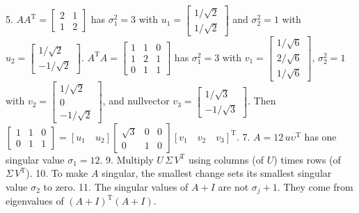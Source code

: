 5. \(AA^{\mathrm{T}}=\begin{bmatrix}2&1\\ 1&2\end{bmatrix}\) has \(\sigma_{1}^{2}=3\) with \(u_{1}=\begin{bmatrix}1/\sqrt{2}\\ 1/\sqrt{2}\end{bmatrix}\) and \(\sigma_{2}^{2}=1\) with \(u_{2}=\begin{bmatrix}1/\sqrt{2}\\ -1/\sqrt{2}\end{bmatrix}\). \(A^{\mathrm{T}}A=\begin{bmatrix}1&1&0\\ 1&2&1\\ 0&1&1\end{bmatrix}\) has \(\sigma_{1}^{2}=3\) with \(v_{1}=\begin{bmatrix}1/\sqrt{6}\\ 2/\sqrt{6}\\ 1/\sqrt{6}\end{bmatrix}\), \(\sigma_{2}^{2}=1\) with \(v_{2}=\begin{bmatrix}1/\sqrt{2}\\ 0\\ -1/\sqrt{2}\end{bmatrix}\), and nullvector \(v_{3}=\begin{bmatrix}1/\sqrt{3}\\ -1/\sqrt{3}\end{bmatrix}\). Then \(\begin{bmatrix}1&1&0\\ 0&1&1\end{bmatrix}=[u_{1}\quad u_{2}]\begin{bmatrix}\sqrt{3}&0&0\\ 0&1&0\end{bmatrix}[v_{1}\quad v_{2}\quad v_{3}]^{\mathrm{T}}\).
7. \(A=12\,u\upsilon^{\mathrm{T}}\) has one singular value \(\sigma_{1}=12\).
9. Multiply \(U\,\Sigma\,V^{\mathrm{T}}\) using columns (of \(U\)) times rows (of \(\Sigma\,V^{\mathrm{T}}\)).
10. To make \(A\) singular, the smallest change sets its smallest singular value \(\sigma_{2}\) to zero.
11. The singular values of \(A+I\) are not \(\sigma_{j}+1\). They come from eigenvalues of \((A+I)^{\mathrm{T}}(A+I)\).
